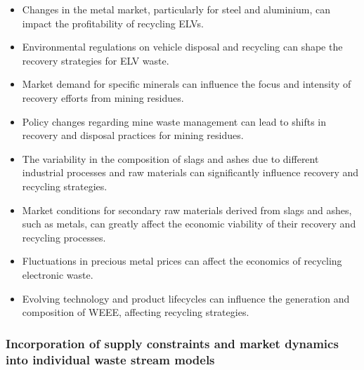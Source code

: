 \wasteSubsubsubsecELV
\begin{itemize}
    \item Changes in the metal market, particularly for steel and aluminium, can impact the profitability of recycling ELVs.
    \item Environmental regulations on vehicle disposal and recycling can shape the recovery strategies for ELV waste.
\end{itemize}

\wasteSubsubsubsecMIN
\begin{itemize}
    \item Market demand for specific minerals can influence the focus and intensity of recovery efforts from mining residues.
    \item Policy changes regarding mine waste management can lead to shifts in recovery and disposal practices for mining residues.
\end{itemize}

\wasteSubsubsubsecSLASH
\begin{itemize}
    \item The variability in the composition of slags and ashes due to different industrial processes and raw materials can significantly influence recovery and recycling strategies.
    \item Market conditions for secondary raw materials derived from slags and ashes, such as metals, can greatly affect the economic viability of their recovery and recycling processes.
\end{itemize}

\wasteSubsubsubsecWEEE
\begin{itemize}
    \item Fluctuations in precious metal prices can affect the economics of recycling electronic waste.
    \item Evolving technology and product lifecycles can influence the generation and composition of WEEE, affecting recycling strategies.
\end{itemize}

\subsectionEndline


\clearpage
\subsubsection{Incorporation of supply constraints and market dynamics into individual waste stream models}


